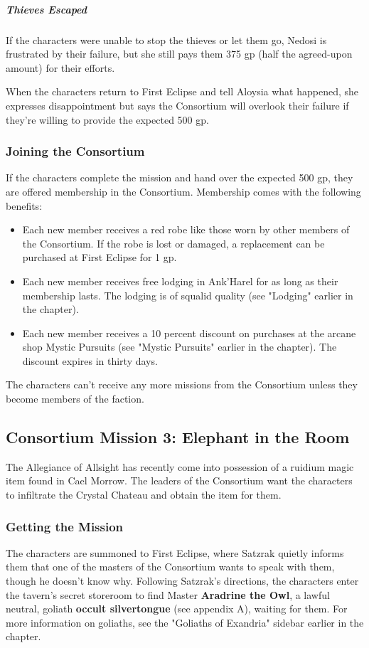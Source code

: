 \documentclass[10pt,a4paper,twoside,fancy,bg=print,twocolumn,openany,nodeprecatedcode]{dndbook}
\begin{document}
\subparagraph{Thieves Escaped}
If the characters were unable to stop the thieves or let them go, Nedosi is frustrated by their failure, but she still pays them 375 gp (half the agreed-upon amount) for their efforts.

When the characters return to First Eclipse and tell Aloysia what happened, she expresses disappointment but says the Consortium will overlook their failure if they're willing to provide the expected 500 gp.

\subsubsection{Joining the Consortium}
If the characters complete the mission and hand over the expected 500 gp, they are offered membership in the Consortium. Membership comes with the following benefits:


\begin{itemize}
\item Each new member receives a red robe like those worn by other members of the Consortium. If the robe is lost or damaged, a replacement can be purchased at First Eclipse for 1 gp.
\item Each new member receives free lodging in Ank'Harel for as long as their membership lasts. The lodging is of squalid quality (see "Lodging" earlier in the chapter).
\item Each new member receives a 10 percent discount on purchases at the arcane shop Mystic Pursuits (see "Mystic Pursuits" earlier in the chapter). The discount expires in thirty days.
\end{itemize}

The characters can't receive any more missions from the Consortium unless they become members of the faction.

\subsection{Consortium Mission 3: Elephant in the Room}
The Allegiance of Allsight has recently come into possession of a ruidium magic item found in Cael Morrow. The leaders of the Consortium want the characters to infiltrate the Crystal Chateau and obtain the item for them.

\subsubsection{Getting the Mission}
The characters are summoned to First Eclipse, where Satzrak quietly informs them that one of the masters of the Consortium wants to speak with them, though he doesn't know why. Following Satzrak's directions, the characters enter the tavern's secret storeroom to find Master \textbf{Aradrine the Owl}, a lawful neutral, goliath \textbf{occult silvertongue} (see appendix A), waiting for them. For more information on goliaths, see the "Goliaths of Exandria" sidebar earlier in the chapter.
\end{document}
